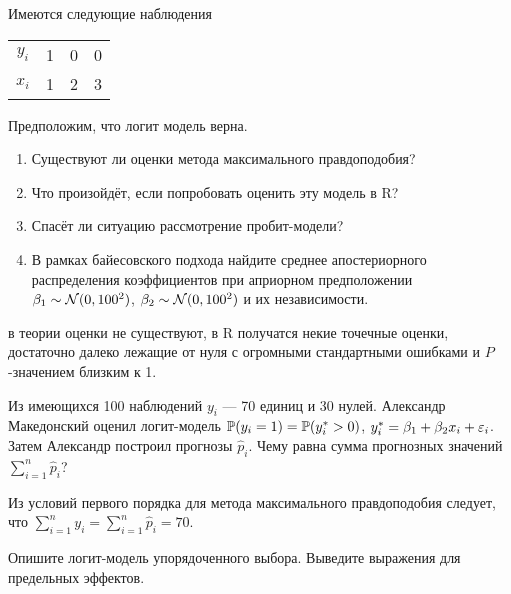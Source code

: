 \begin{problem}
Имеются следующие наблюдения

\begin{tabular}{c|ccc}
\toprule
$y_i$ & 1 & 0 & 0 \\
$x_i$ & 1 & 2 & 3 \\
\bottomrule
\end{tabular}

Предположим, что логит модель верна.

\begin{enumerate}
\item Существуют ли оценки метода максимального правдоподобия?
\item Что произойдёт, если попробовать оценить эту модель в R?
\item Спасёт ли ситуацию рассмотрение пробит-модели?
\item В рамках байесовского подхода найдите среднее апостериорного распределения коэффициентов при априорном предположении $\beta_1 \sim \cN(0, 100^2)$, $\beta_2 \sim \cN(0, 100^2)$ и их независимости.
\end{enumerate}



\begin{sol}
в теории оценки не существуют, в R получатся некие точечные оценки, достаточно далеко лежащие от нуля с огромными стандартными ошибками и $P$-значением близким к 1.
\end{sol}
\end{problem}



\begin{problem}
Из имеющихся 100 наблюдений $y_i$ — 70 единиц и 30 нулей. Александр Македонский оценил логит-модель $\P(y_i=1)=\P(y_i^*>0)$, $y_i^*=\beta_1 + \beta_2 x_i + \e_i$.  Затем Александр построил прогнозы $\hat{p}_i$. Чему равна сумма прогнозных значений $\sum_{i=1}^n \hat{p}_i$?


\begin{sol}
Из условий первого порядка для метода максимального правдоподобия следует, что $\sum_{i=1}^n y_i = \sum_{i=1}^n \hat{p}_i=70$.
\end{sol}
\end{problem}

\begin{problem}
Опишите логит-модель упорядоченного выбора. Выведите выражения для предельных эффектов.
\begin{sol}
\end{sol}
\end{problem}


